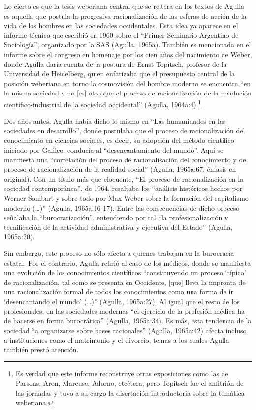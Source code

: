 Lo cierto es que la tesis weberiana central que se reitera en los textos de Agulla es aquella que postula la progresiva racionalización de las esferas de acción de la vida de los hombres en las sociedades occidentales. Esta idea ya aparece en el informe técnico que escribió en 1960 sobre el \enquote{Primer Seminario Argentino de Sociología}, organizado por la SAS (Agulla, 1965a). También es mencionada en el informe sobre el congreso en homenaje por los cien años del nacimiento de Weber, donde Agulla daría cuenta de la postura de Ernst Topitsch, profesor de la Universidad de Heidelberg, quien enfatizaba que el presupuesto central de la posición weberiana en torno la cosmovisión del hombre moderno se encuentra \enquote{en la misma sociedad y no [es] otro que el proceso de racionalización de la revolución científico-industrial de la sociedad occidental} (Agulla, 1964a:4).\footnote{Es verdad que este informe reconstruye otras exposiciones como las de Parsons, Aron, Marcuse, Adorno, etcétera, pero Topitsch fue el anfitrión de las jornadas y tuvo a su cargo la disertación introductoria sobre la temática weberiana.}

Dos años antes, Agulla había dicho lo mismo en \enquote{Las humanidades en las sociedades en desarrollo}, donde postulaba que el proceso de racionalización del conocimiento en ciencias sociales, es decir, su adopción del método científico iniciado por Galileo, conducía al \enquote{desencantamiento del mundo}. Aquí se manifiesta una \enquote{correlación del proceso de racionalización del conocimiento y del proceso de racionalización de la realidad social} (Agulla, 1965a:67, énfasis en original). Con un título más que elocuente, \enquote{El proceso de racionalización en la sociedad contemporánea}, de 1964, resaltaba los \enquote{análisis históricos hechos por Werner Sombart y sobre todo por Max Weber sobre la formación del capitalismo moderno (\dots)} (Agulla, 1965a:16-17). Entre las consecuencias de dicho proceso señalaba la \enquote{burocratización}, entendiendo por tal \enquote{la profesionalización y tecnificación de la actividad administrativa y ejecutiva del Estado} (Agulla, 1965a:20).

Sin embargo, este proceso no sólo afecta a quienes trabajan en la burocracia estatal. Por el contrario, Agulla refirió al caso de los médicos, donde se manifiesta una evolución de los conocimientos científicos \enquote{constituyendo un proceso \enquote{típico} de racionalización, tal como se presenta en Occidente, [que] lleva la impronta de una racionalización formal de todos los conocimientos como una forma de ir \enquote{desencantando el mundo} (\dots)} (Agulla, 1965a:27). Al igual que el resto de los profesionales, en las sociedades modernas \enquote{el ejercicio de la profesión médica ha de hacerse en forma burocrática} (Agulla, 1965a:34). Es más, esta tendencia de la sociedad \enquote{a organizarse sobre bases racionales} (Agulla, 1965a:42) afecta incluso a instituciones como el matrimonio y el divorcio, temas a los cuales Agulla también prestó atención.

